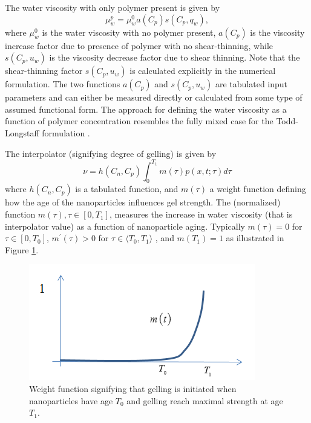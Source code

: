 \documentclass[nanomaterials,article,submit,moreauthors,pdftex]{Definitions/mdpi}
\begin{document}
The water viscosity with only polymer present is given by
\begin{equation}
    \mu_w^p=\mu_w^0 a(C_p) s(C_p, q_w),
\end{equation}
where $\mu_w^0$ is the water viscosity with no polymer present, $a (C_p)$ is the viscosity increase factor due to presence of polymer with no shear-thinning, while $s(C_p, u_w)$ is the viscosity decrease factor due to shear thinning. Note that the shear-thinning factor $s(C_p, u_w)$ is calculated explicitly in the numerical formulation. The two functions $a (C_p)$ and $s(C_p, u_w)$ are tabulated input parameters and can either be measured directly or calculated from some type of assumed functional form. The approach for defining the water viscosity as a function of polymer concentration resembles the fully mixed case for the Todd-Longstaff formulation \citep{slb2015}.   

The interpolator (signifying degree of gelling) is given by
\begin{equation} \label{eq:ageEffect} %
    \nu=h(C_n,C_p) \int^{T_1}_{0}m(\tau)p(x,t;\tau)d\tau
\end{equation}
where $h(C_n,C_p)$ is a tabulated function, and $m(\tau)$ a weight function defining how the age of the nanoparticles influences gel strength. The (normalized) function $m(\tau), \tau\in[0,T_1]$, measures the increase in water viscosity (that is interpolator value) as a function of nanoparticle aging. Typically $m(\tau)=0$ for $\tau\in[0,T_0]$,  $m^\prime(\tau)>0$ for $\tau\in\langle T_0, T_1\rangle$ , and $m(T_1)=1$ as illustrated in Figure \ref{fig:weightFunc}.

\begin{figure}[h]
    \centering
    \includegraphics[width=.5\textwidth]{fig/weightFunc.png}
    \caption{Weight function signifying that gelling is initiated when nanoparticles have age $T_0$ and gelling reach maximal strength at age $T_1$.}
    \label{fig:weightFunc}
\end{figure}
\end{document}
